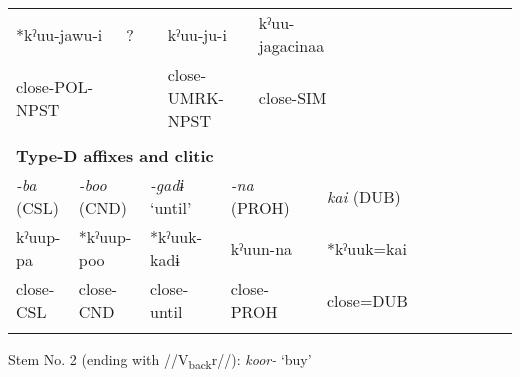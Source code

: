 \begin{tabularx}{\textwidth}{XXXXXXXXXXXXXXXXXXXXXXX}
\multicolumn{4}{X}{{ *kˀuu-jawu-i}} & \multicolumn{2}{X}{{ ?}} & \multicolumn{4}{X}{kˀuu-ju-i} & \multicolumn{4}{X}{{ kˀuu-jagacinaa}} & \multicolumn{9}{X}{}\\
\multicolumn{4}{X}{close-POL-NPST} & \multicolumn{2}{X}{} & \multicolumn{4}{X}{close-UMRK-NPST} & \multicolumn{4}{X}{close-SIM} & \multicolumn{9}{X}{}\\
\multicolumn{23}{X}{}\\
\multicolumn{23}{X}{{\bfseries Type-D affixes and clitic}}\\
\multicolumn{2}{X}{{ \textit{{}-ba} (CSL)}} & \multicolumn{3}{X}{{ \textit{{}-boo} (CND)}} & \multicolumn{4}{X}{{ \textit{{}-gadɨ} ‘until’}} & \multicolumn{4}{X}{{ \textit{{}-na} (PROH)}} & \multicolumn{4}{X}{{ \textit{kai} (DUB)}} & \multicolumn{6}{X}{}\\
\multicolumn{2}{X}{{ kˀuup-pa}} & \multicolumn{3}{X}{{ *kˀuup-poo}} & \multicolumn{4}{X}{{ *kˀuuk-kadɨ}} & \multicolumn{4}{X}{{ kˀuun-na}} & \multicolumn{4}{X}{{ *kˀuuk=kai}} & \multicolumn{6}{X}{}\\
\multicolumn{2}{X}{close-CSL} & \multicolumn{3}{X}{close-CND} & \multicolumn{4}{X}{close-until} & \multicolumn{4}{X}{close-PROH} & \multicolumn{4}{X}{close=DUB} & \multicolumn{6}{X}{}\\
\lspbottomrule
\end{tabularx}
Stem No. 2 (ending with //V\textsubscript{back}r//): \textit{koor-} ‘buy’

\tablefirsthead{}

